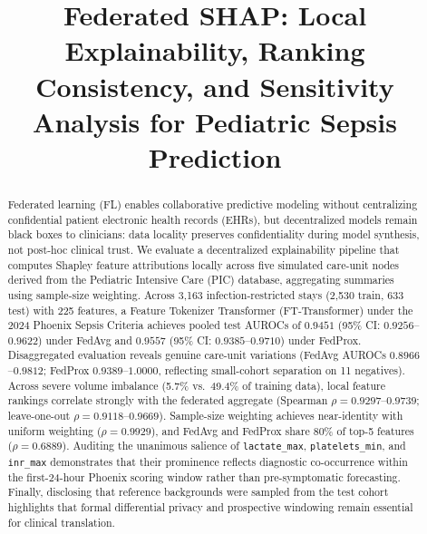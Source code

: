 \documentclass[conference,a4paper]{IEEEtran}
\begin{document}
\title{Federated SHAP: Local Explainability, Ranking Consistency, and Sensitivity Analysis for Pediatric Sepsis Prediction}

\author{
}


\maketitle

\begin{abstract}
Federated learning (FL) enables collaborative predictive modeling without centralizing confidential patient electronic health records (EHRs), but decentralized models remain black boxes to clinicians: data locality preserves confidentiality during model synthesis, not post-hoc clinical trust. We evaluate a decentralized explainability pipeline that computes Shapley feature attributions locally across five simulated care-unit nodes derived from the Pediatric Intensive Care (PIC) database, aggregating summaries using sample-size weighting. Across 3,163 infection-restricted stays (2,530 train, 633 test) with 225 features, a Feature Tokenizer Transformer (FT-Transformer) under the 2024 Phoenix Sepsis Criteria achieves pooled test AUROCs of $0.9451$ (95\% CI: $0.9256$--$0.9622$) under FedAvg and $0.9557$ (95\% CI: $0.9385$--$0.9710$) under FedProx. Disaggregated evaluation reveals genuine care-unit variations (FedAvg AUROCs $0.8966$--$0.9812$; FedProx $0.9389$--$1.0000$, reflecting small-cohort separation on 11 negatives). Across severe volume imbalance (5.7\% vs.\ 49.4\% of training data), local feature rankings correlate strongly with the federated aggregate (Spearman $\rho = 0.9297$--$0.9739$; leave-one-out $\rho = 0.9118$--$0.9669$). Sample-size weighting achieves near-identity with uniform weighting ($\rho = 0.9929$), and FedAvg and FedProx share 80\% of top-5 features ($\rho = 0.6889$). Auditing the unanimous salience of \texttt{lactate\_max}, \texttt{platelets\_min}, and \texttt{inr\_max} demonstrates that their prominence reflects diagnostic co-occurrence within the first-24-hour Phoenix scoring window rather than pre-symptomatic forecasting. Finally, disclosing that reference backgrounds were sampled from the test cohort highlights that formal differential privacy and prospective windowing remain essential for clinical translation.
\end{abstract}
\end{document}
